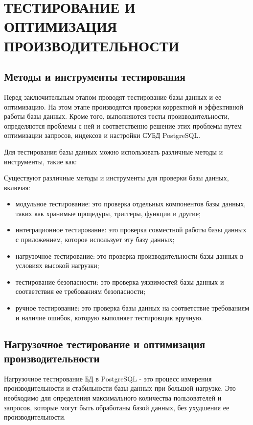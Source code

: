 \section{ТЕСТИРОВАНИЕ И ОПТИМИЗАЦИЯ ПРОИЗВОДИТЕЛЬНОСТИ}

\subsection{Методы и инструменты тестирования}

Перед заключительным этапом проводят тестирование базы данных и ее оптимизацию. На этом этапе производятся проверки корректной и эффективной работы базы данных. Кроме того, выполняются тесты производительности, определяются проблемы с ней и соответственно решение этих проблемы путем оптимизации запросов, индексов и настройки СУБД PostgreSQL.

Для тестирования базы данных можно использовать различные методы и инструменты, такие как:

Существуют различные методы и инструменты для проверки базы данных, включая:

\begin{itemize}
    \item модульное тестирование: это проверка отдельных компонентов базы данных, таких как хранимые процедуры, триггеры, функции и другие;
    \item интеграционное тестирование: это проверка совместной работы базы данных с приложением, которое использует эту базу данных;
    \item нагрузочное тестирование: это проверка производительности базы данных в условиях высокой нагрузки;
    \item тестирование безопасности: это проверка уязвимостей базы данных и соответствия ее требованиям безопасности;
    \item ручное тестирование: это проверка базы данных на соответствие требованиям и наличие ошибок, которую выполняет тестировщик вручную.
\end{itemize}



\subsection{Нагрузочное тестирование и оптимизация производительности}

Нагрузочное тестирование БД в PostgreSQL - это процесс измерения производительности и стабильности базы данных при большой нагрузке. Это необходимо для определения максимального количества пользователей и запросов, которые могут быть обработаны базой данных, без ухудшения ее производительности.

